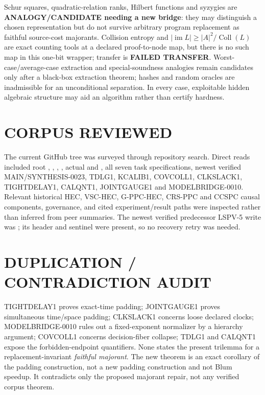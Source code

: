 \documentclass[11pt]{article}
\begin{document}
Schur squares, quadratic-relation ranks, Hilbert functions and syzygies are
\textbf{ANALOGY/CANDIDATE needing a new bridge}: they may distinguish a
chosen representation but do not survive arbitrary program replacement as
faithful source-cost majorants.  Collision entropy and
$|\operatorname{im}L|\ge |A|^2/\operatorname{Coll}(L)$ are exact counting
tools at a declared proof-to-node map, but there is no such map in this
one-bit wrapper; transfer is \textbf{FAILED TRANSFER}.  Worst-case/average-case
extraction and special-soundness analogies remain candidates only after a
black-box extraction theorem; hashes and random oracles are inadmissible for
an unconditional separation.  In every case, exploitable hidden algebraic
structure may aid an algorithm rather than certify hardness.

\section{CORPUS REVIEWED}

The current GitHub tree was surveyed through repository search.  Direct reads
included root , , ,
, actual  and
, all seven task specifications, newest verified
MAIN/SYNTHESIS-0023, TDLG1, KCALIB1, COVCOLL1, CLKSLACK1, TIGHTDELAY1,
CALQNT1, JOINTGAUGE1 and MODELBRIDGE-0010.  Relevant historical HEC,
VSC-HEC, G-PPC-HEC, CRS-PPC and CCSPC causal components, governance, and
cited experiment/result paths were inspected rather than inferred from peer
summaries.  The newest verified predecessor LSPV-5 write was
; its header and
sentinel were present, so no recovery retry was needed.

\section{DUPLICATION / CONTRADICTION AUDIT}

TIGHTDELAY1 proves exact-time padding; JOINTGAUGE1 proves simultaneous
time/space padding; CLKSLACK1 concerns loose declared clocks;
MODELBRIDGE-0010 rules out a fixed-exponent normalizer by a hierarchy
argument; COVCOLL1 concerns decision-fiber collapse; TDLG1 and CALQNT1 expose
the forbidden-endpoint quantifiers.  None states the present trilemma for a
replacement-invariant \emph{faithful majorant}.  The new theorem is an exact
corollary of the padding construction, not a new padding construction and not
Blum speedup.  It contradicts only the proposed majorant repair, not any
verified corpus theorem.
\end{document}
